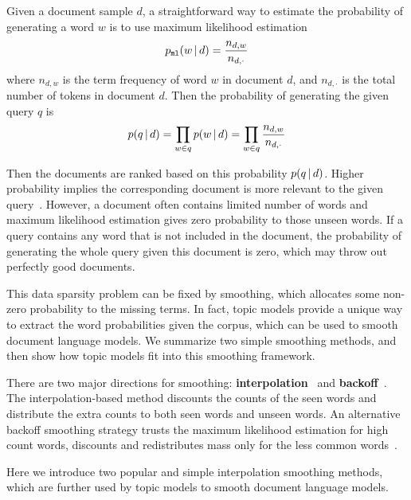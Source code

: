 Given a document sample $d$, a straightforward way to estimate the
probability of generating a word $w$ is to use maximum likelihood
estimation
\begin{align}
p_{\texttt{ml}}(w \, | \, d) = \frac{n_{d,w}}{n_{d,\cdot}}
\label{eq:ir_mse}
\end{align}
where $n_{d,w}$ is the term frequency of word $w$ in document $d$, and
$n_{d,\cdot}$ is the total number of tokens in document $d$. Then the
probability of generating the given query $q$ is
\begin{align}
p(q \, | \, d) = \prod_{w \in q} p(w \, | \, d) = \prod_{w \in q} \frac{n_{d,w}}{n_{d,\cdot}}
\end{align}

Then the documents are ranked based on this probability $p(q \, | \, d)$. Higher
probability implies the corresponding document is more relevant to the
given query~\citep{song-99}. However, a document often contains limited number of words and
maximum likelihood estimation gives zero probability to those unseen words.
If a query contains any word that is not included in the document, the probability
of generating the whole query given this document is zero, which may throw out perfectly good documents.

This data sparsity problem can be fixed by smoothing, which allocates
some non-zero probability to the missing terms. In fact, topic models
provide a unique way to extract the word probabilities given the
corpus, which can be used to smooth document language models.  We
summarize two simple smoothing methods, and then show how topic models
fit into this smoothing framework.


There are two major directions for smoothing:
\textbf{interpolation}~\citep{Jelinek-1980,mackay95dirichlet,Ney-1994,PonteCroft,zhai-01}
and \textbf{backoff}~\citep{katz-87,song-99}. The interpolation-based
method discounts the counts of the seen words and distribute the extra
counts to both seen words and unseen words. An alternative backoff
smoothing strategy trusts the maximum likelihood estimation for high
count words, discounts and redistributes mass only for the less common
words~\citep{zhai-01}.

Here we introduce two popular and simple interpolation smoothing
methods, which are further used by topic models to smooth document
language models.

